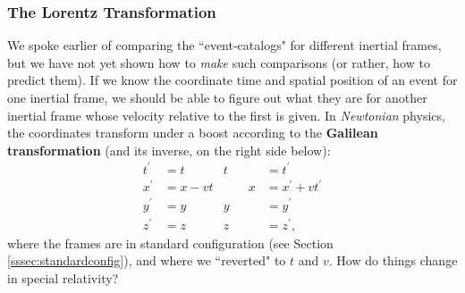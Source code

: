 \documentclass[12pt]{article}
\begin{document}
\subsubsection{The Lorentz Transformation}\label{sssec:lt}

We spoke earlier of comparing the ``event-catalogs" for different inertial frames, but we have not yet shown how to \emph{make} such comparisons (or rather, how to predict them). If we know the coordinate time and spatial position of an event for one inertial frame, we should be able to figure out what they are for another inertial frame whose velocity relative to the first is given. In \emph{Newtonian} physics, the coordinates transform under a boost according to the \textbf{Galilean transformation} (and its inverse, on the right side below):
\begin{equation*}
\begin{aligned}
t^{\prime} &= t& t&= t^\prime \\
x^{\prime} &= x - vt& \qquad x &= x^\prime + vt^\prime\\
y^{\prime} &= y& y&= y^\prime\\
z^{\prime} &= z& z&= z^\prime ,
\end{aligned}
\end{equation*}
where the frames are in standard configuration (see Section \ref{sssec:standardconfig}), and where we ``reverted" to $t$ and $v$. How do things change in special relativity?
\end{document}

